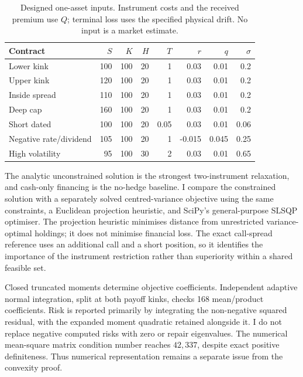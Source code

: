 \documentclass[11pt]{article}
\begin{document}
\begin{table}[tb]\centering\small
\begin{tabular}{lrrrrrrr}\toprule
Contract & $S$ & $K$ & $H$ & $T$ & $r$ & $q$ & $\sigma$\\\midrule
Lower kink & 100 & 100 & 20 & 1 & 0.03 & 0.01 & 0.2 \\
Upper kink & 120 & 100 & 20 & 1 & 0.03 & 0.01 & 0.2 \\
Inside spread & 110 & 100 & 20 & 1 & 0.03 & 0.01 & 0.2 \\
Deep cap & 160 & 100 & 20 & 1 & 0.03 & 0.01 & 0.2 \\
Short dated & 100 & 100 & 20 & 0.05 & 0.03 & 0.01 & 0.06 \\
Negative rate/dividend & 105 & 100 & 20 & 1 & -0.015 & 0.045 & 0.25 \\
High volatility & 95 & 100 & 30 & 2 & 0.03 & 0.01 & 0.65 \\
\bottomrule\end{tabular}
\caption{Designed one-asset inputs. Instrument costs and the received premium use $Q$; terminal loss uses the specified physical drift. No input is a market estimate.}
\label{tab:h-contracts}\end{table}

The analytic unconstrained solution is the strongest two-instrument
relaxation, and cash-only financing is the no-hedge baseline.
I compare the constrained solution with a separately solved
centred-variance objective using the same constraints, a Euclidean
projection heuristic, and SciPy's general-purpose SLSQP optimiser.
The projection heuristic minimises distance from unrestricted
variance-optimal holdings; it does not minimise financial loss.
The exact call-spread reference uses an additional call and a short
position, so it identifies the importance of the instrument restriction
rather than superiority within a shared feasible set.

Closed truncated moments determine objective coefficients.
Independent adaptive normal integration, split at both payoff kinks,
checks 168 mean/product coefficients. Risk is reported primarily by
integrating the non-negative squared residual, with the expanded
moment quadratic retained alongside it. I do not replace negative
computed risks with zero or repair eigenvalues. The numerical mean-square
matrix condition number reaches $42,337$, despite exact positive
definiteness. Thus numerical representation remains a separate issue
from the convexity proof.
\end{document}
